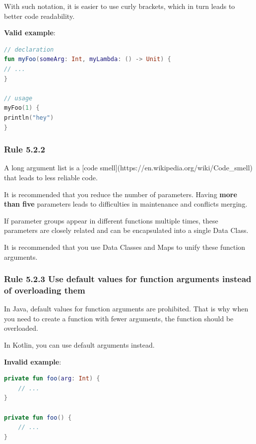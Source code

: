 {{{{With such notation, it is easier to use curly brackets, which in turn leads to better code readability.



\textbf{Valid example}:

\begin{lstlisting}[language=Kotlin]
// declaration
fun myFoo(someArg: Int, myLambda: () -> Unit) {
// ...
}

// usage
myFoo(1) {
println("hey")
}
\end{lstlisting}


\subsubsection*{\textbf{Rule 5.2.2}}
\leavevmode\newline



A long argument list is a [code smell](https://en.wikipedia.org/wiki/Code\_smell) that leads to less reliable code.

It is recommended that you reduce the number of parameters. Having \textbf{more than five} parameters leads to difficulties in maintenance and conflicts merging.

If parameter groups appear in different functions multiple times, these parameters are closely related and can be encapsulated into a single Data Class.

It is recommended that you use Data Classes and Maps to unify these function arguments.



\subsubsection*{\textbf{Rule 5.2.3 Use default values for function arguments instead of overloading them}}
\leavevmode\newline

In Java, default values for function arguments are prohibited. That is why when you need to create a function with fewer arguments, the function should be overloaded.

In Kotlin, you can use default arguments instead.



\textbf{Invalid example}:

\begin{lstlisting}[language=Kotlin]
private fun foo(arg: Int) {
    // ...
}

private fun foo() {
    // ...
}
\end{lstlisting}


}}}}
